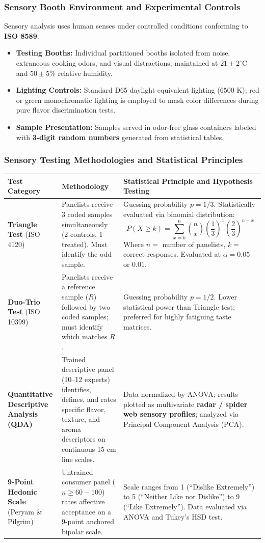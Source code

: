 \documentclass[11pt,a4paper,oneside]{article}
\begin{document}
\subsubsection{Sensory Booth Environment and Experimental Controls}
Sensory analysis uses human senses under controlled conditions conforming to \textbf{ISO 8589}:
\begin{itemize}[leftmargin=*]
    \item \textbf{Testing Booths:} Individual partitioned booths isolated from noise, extraneous cooking odors, and visual distractions; maintained at $21\pm 2^\circ\text{C}$ and $50\pm 5\%$ relative humidity.
    \item \textbf{Lighting Controls:} Standard D65 daylight-equivalent lighting ($6500\text{ K}$); red or green monochromatic lighting is employed to mask color differences during pure flavor discrimination tests.
    \item \textbf{Sample Presentation:} Samples served in odor-free glass containers labeled with \textbf{3-digit random numbers} generated from statistical tables.
\end{itemize}

\subsubsection{Sensory Testing Methodologies and Statistical Principles}

\begin{center}
\begin{tabular}{@{}p{3.0cm} p{4.0cm} p{9.0cm}@{}}
\toprule
\textbf{Test Category} & \textbf{Methodology} & \textbf{Statistical Principle and Hypothesis Testing} \tabularnewline
\midrule
\textbf{Triangle Test} (ISO 4120) & Panelists receive 3 coded samples simultaneously (2 controls, 1 treated). Must identify the odd sample. & Guessing probability $p = 1/3$. Statistically evaluated via binomial distribution:
$$P(X \ge k) = \sum_{x=k}^{n} \binom{n}{x} \left(\frac{1}{3}\right)^x \left(\frac{2}{3}\right)^{n-x}$$
Where $n =$ number of panelists, $k =$ correct responses. Evaluated at $\alpha = 0.05$ or $0.01$. \tabularnewline
\textbf{Duo-Trio Test} (ISO 10399) & Panelists receive a reference sample ($R$) followed by two coded samples; must identify which matches $R$. & Guessing probability $p = 1/2$. Lower statistical power than Triangle test; preferred for highly fatiguing taste matrices. \tabularnewline
\textbf{Quantitative Descriptive Analysis (QDA)} & Trained descriptive panel (10--12 experts) identifies, defines, and rates specific flavor, texture, and aroma descriptors on continuous 15-cm line scales. & Data normalized by ANOVA; results plotted as multivariate \textbf{radar / spider web sensory profiles}; analyzed via Principal Component Analysis (PCA). \tabularnewline
\textbf{9-Point Hedonic Scale} (Peryam \& Pilgrim) & Untrained consumer panel ($n \ge 60-100$) rates affective acceptance on a 9-point anchored bipolar scale. & Scale ranges from 1 (``Dislike Extremely'') to 5 (``Neither Like nor Dislike'') to 9 (``Like Extremely''). Data evaluated via ANOVA and Tukey's HSD test. \tabularnewline
\bottomrule
\end{tabular}
\end{center}
\end{document}
